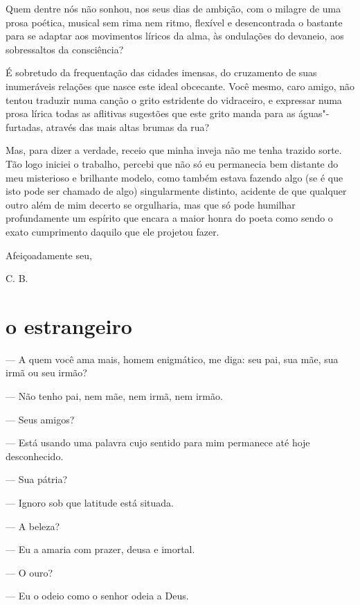 Quem dentre nós não sonhou, nos seus dias de ambição, com o milagre de
uma prosa poética, musical sem rima nem ritmo, flexível e
desencontrada o bastante para se adaptar aos movimentos líricos da
alma, às ondulações do devaneio, aos sobressaltos da consciência?

É sobretudo da frequentação
das cidades imensas, do cruzamento de suas
inumeráveis relações que nasce este ideal obcecante. Você mesmo, 
caro amigo, não tentou traduzir numa canção o grito estridente do
vidraceiro, e expressar numa prosa lírica todas as aflitivas sugestões
que este grito manda para as águas"-furtadas, através das mais altas
brumas da rua?

Mas, para dizer a verdade, receio que minha inveja não me tenha trazido
sorte. Tão logo iniciei o trabalho, percebi que não só eu
permanecia bem distante do meu misterioso e brilhante modelo, como
também estava fazendo algo (se é que isto pode ser chamado de algo)
singularmente distinto, acidente de que qualquer outro além de mim
decerto se orgulharia, mas que só pode humilhar profundamente um
espírito que encara a maior honra do poeta como sendo o exato
cumprimento daquilo que ele projetou fazer.

\begin{flushright}
Afeiçoadamente seu,

C. B.
\end{flushright}

\setcounter{secnumdepth}{2} 

\quebra\section[O estrangeiro]{o estrangeiro}

--- A quem você ama mais, homem enigmático, me diga: seu pai, sua mãe, sua
irmã ou seu irmão?

--- Não tenho pai, nem mãe, nem irmã, nem irmão.

--- Seus amigos?

--- Está usando uma palavra cujo sentido para mim permanece
até hoje desconhecido.

--- Sua pátria?

--- Ignoro sob que latitude está situada.

--- A beleza?

--- Eu a amaria com prazer, deusa e imortal.

--- O ouro?

--- Eu o odeio como o senhor odeia a Deus.

